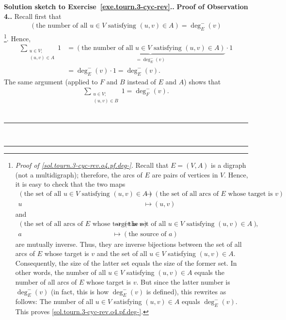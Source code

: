 \documentclass[numbers=enddot,12pt,final,onecolumn,notitlepage]{scrartcl}%
\theoremstyle{definition}
\newenvironment{proof}[1][Proof]{\noindent\textbf{#1.} }{\ \rule{0.5em}{0.5em}}
\let\sumnonlimits\sum
\renewcommand{\sum}{\sumnonlimits\limits}
\newcommand{\tup}[1]{\left( #1 \right)}
\newcommand{\underbrack}[2]{\underbrace{#1}_{\substack{#2}}}
\begin{document}
\begin{proof}[Solution sketch to Exercise~\ref{exe.tourn.3-cyc-rev}.]
\begin{proof}[Proof of Observation 4.]
Recall first that
\begin{align}
\tup{\text{the number of all } u \in V \text{ satisfying }
      \tup{u, v} \in A}
 = \deg^-_E \tup{v}
\label{sol.tourn.3-cyc-rev.o4.pf.deg-}
\end{align}
\footnote{\textit{Proof of
\eqref{sol.tourn.3-cyc-rev.o4.pf.deg-}.} Recall
that $E = \tup{V, A}$ is a digraph (not a multidigraph);
therefore, the arcs of $E$ are pairs of vertices in $V$.
Hence, it is easy to check that the two maps
\begin{align*}
\tup{\text{the set of all } u \in V \text{ satisfying }
     \tup{u, v} \in A}
&\to
\tup{\text{the set of all arcs of } E \text{ whose target is } v}, \\
u &\mapsto \tup{u, v}
\end{align*}
and
\begin{align*}
\tup{\text{the set of all arcs of } E \text{ whose target is } v}
&\to
\tup{\text{the set of all } u \in V \text{ satisfying }
     \tup{u, v} \in A}
, \\
a &\mapsto \tup{\text{the source of } a}
\end{align*}
are mutually inverse. Thus, they are inverse bijections between
the set of all arcs of $E$ whose target is $v$ and the set of all
$u \in V$ satisfying $\tup{u, v} \in A$. Consequently, the size
of the latter set equals the size of the former set. In other
words, the number of all $u \in V$ satisfying $\tup{u, v} \in A$
equals the number of all arcs of $E$ whose target is $v$. But
since the latter number is $\deg^-_E \tup{v}$ (in fact, this is how
$\deg^-_E \tup{v}$ is defined), this rewrites as follows: The number
of all $u \in V$ satisfying $\tup{u, v} \in A$ equals
$\deg^-_E \tup{v}$. This proves
\eqref{sol.tourn.3-cyc-rev.o4.pf.deg-}.}. Hence,
\begin{align}
\sum_{\substack{u \in V;\\ \tup{u, v} \in A}} 1
&= \underbrack{\tup{\text{the number of all } u \in V \text{ satisfying }
                \tup{u, v} \in A}}{= \deg^-_E \tup{v}} \cdot 1
\nonumber \\
&= \deg^-_E \tup{v} \cdot 1
= \deg^-_E \tup{v} .
\label{sol.tourn.3-cyc-rev.o4.pf.A}
\end{align}
The same argument (applied to $F$ and $B$ instead of $E$ and $A$) shows
that
\begin{align}
\sum_{\substack{u \in V;\\ \tup{u, v} \in B}} 1
= \deg^-_F \tup{v} .

\end{align}
\end{proof}
\end{proof}
\end{document}
